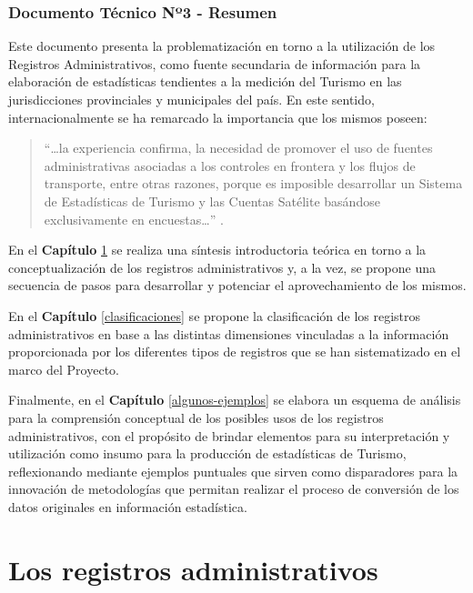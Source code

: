 \documentclass[
]{book}
\begin{document}
\hypertarget{documento-tuxe9cnico-nuxba3---resumen}{%
\subsection*{Documento Técnico Nº3 - Resumen}\label{documento-tuxe9cnico-nuxba3---resumen}}

Este documento presenta la problematización en torno a la utilización de los Registros Administrativos, como fuente secundaria de información para la elaboración de estadísticas tendientes a la medición del Turismo en las jurisdicciones provinciales y municipales del país. En este sentido, internacionalmente se ha remarcado la importancia que los mismos poseen:

\begin{quote}
``\ldots la experiencia confirma, la necesidad de promover el uso de fuentes administrativas asociadas a los controles en frontera y los flujos de transporte, entre otras razones, porque es imposible desarrollar un Sistema de Estadísticas de Turismo y las Cuentas Satélite basándose exclusivamente en encuestas\ldots{}'' \citep{ife2006}.
\end{quote}

En el \textbf{Capítulo} \ref{los-registros-administrativos} se realiza una síntesis introductoria teórica en torno a la conceptualización de los registros administrativos y, a la vez, se propone una secuencia de pasos para desarrollar y potenciar el aprovechamiento de los mismos.

En el \textbf{Capítulo} \ref{clasificaciones} se propone la clasificación de los registros administrativos en base a las distintas dimensiones vinculadas a la información proporcionada por los diferentes tipos de registros que se han sistematizado en el marco del Proyecto.

Finalmente, en el \textbf{Capítulo} \ref{algunos-ejemplos} se elabora un esquema de análisis para la comprensión conceptual de los posibles usos de los registros administrativos, con el propósito de brindar elementos para su interpretación y utilización como insumo para la producción de estadísticas de Turismo, reflexionando mediante ejemplos puntuales que sirven como disparadores para la innovación de metodologías que permitan realizar el proceso de conversión de los datos originales en información estadística.

\hypertarget{los-registros-administrativos}{%
\chapter{\texorpdfstring{\textbf{Los registros administrativos}}{Los registros administrativos}}\label{los-registros-administrativos}}
\end{document}
